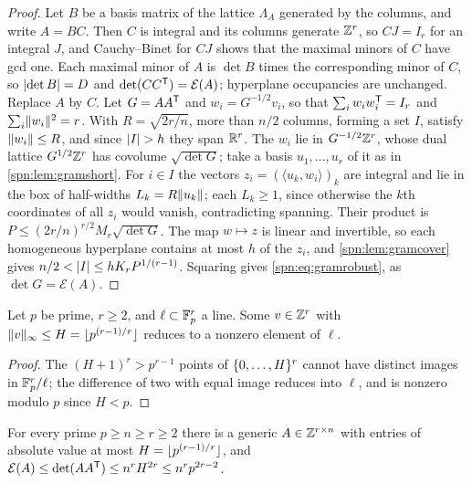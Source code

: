 \begin{proof}
Let $B$ be a basis matrix of the lattice $\Lambda_A$ generated by the columns, and write $A=BC$. Then $C$ is
integral and its columns generate $\mathbb{Z}^r$, so $CJ=I_r$ for an integral $J$, and Cauchy--Binet for $CJ$ shows that
the maximal minors of $C$ have gcd one. Each maximal minor of $A$ is $\det B$ times the corresponding minor of
$C$, so $\lvert\det B\rvert=D$ and $\det(CC^{\mathsf{T}})=\mathcal E(A)$; hyperplane occupancies are unchanged. Replace $A$
by $C$. Let $G=AA^{\mathsf{T}}$ and $w_i=G^{-1/2}v_i$, so that $\sum_iw_iw_i^{\mathsf{T}}=I_r$ and $\sum_i\lVert w_i\rVert^2=r$.
With $R=\sqrt{2r/n}$, more than $n/2$ columns, forming a set $I$, satisfy $\lVert w_i\rVert\le R$, and since
$\lvert I\rvert>h$ they span $\mathbb{R}^r$. The $w_i$ lie in $G^{-1/2}\mathbb{Z}^r$, whose dual lattice $G^{1/2}\mathbb{Z}^r$ has covolume
$\sqrt{\det G}$; take a basis $u_1,\dots,u_r$ of it as in \cref{spn:lem:gramshort}. For $i\in I$ the vectors
$z_i=(\langle u_k,w_i\rangle)_k$ are integral and lie in the box of half-widths $L_k=R\lVert u_k\rVert$; each $L_k\ge1$,
since otherwise the $k$th coordinates of all $z_i$ would vanish, contradicting spanning. Their product is
$P\le(2r/n)^{r/2}M_r\sqrt{\det G}$. The map $w\mapsto z$ is linear and invertible, so each homogeneous hyperplane
contains at most $h$ of the $z_i$, and \cref{spn:lem:gramcover} gives $n/2<\lvert I\rvert\le hK_rP^{1/(r-1)}$. Squaring
gives \eqref{spn:eq:gramrobust}, as $\det G=\mathcal E(A)$.
\end{proof}

\begin{lemma}\label{spn:lem:gramlift}
Let $p$ be prime, $r\ge2$, and $\ell\subset\mathbb{F}_p^r$ a line. Some $v\in\mathbb{Z}^r$ with
$\lVert v\rVert_\infty\le H=\lfloor p^{(r-1)/r}\rfloor$ reduces to a nonzero element of $\ell$.
\end{lemma}

\begin{proof}
The $(H+1)^r>p^{r-1}$ points of $\{0,\dots,H\}^r$ cannot have distinct images in $\mathbb{F}_p^r/\ell$; the
difference of two with equal image reduces into $\ell$, and is nonzero modulo $p$ since $H<p$.
\end{proof}

\begin{proposition}\label{spn:prop:gramcurve}
For every prime $p\ge n\ge r\ge2$ there is a generic $A\in\mathbb{Z}^{r\times n}$ with entries of absolute value at most
$H=\lfloor p^{(r-1)/r}\rfloor$, and $\mathcal E(A)\le\det(AA^{\mathsf{T}})\le n^rH^{2r}\le n^rp^{2r-2}$.
\end{proposition}

